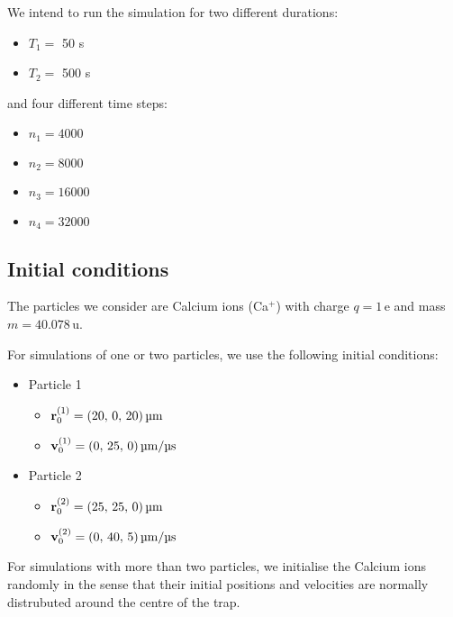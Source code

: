 We intend to run the simulation for two different durations:
\begin{itemize}
    \item[] $T_1 = $ 50 \textmu s
    \item[] $T_2 = $ 500 \textmu s
\end{itemize}
and four different time steps:
\begin{itemize}
    \item[] $n_1 = 4000$
    \item[] $n_2 = 8000$
    \item[] $n_3 = 16000$
    \item[] $n_4 = 32000$
\end{itemize}


\subsection{Initial conditions}\label{sec:initial_conditions}

The particles we consider are Calcium ions (Ca$^+$) with charge $q=1 \,\mathrm{e}$ and mass $m = 40.078 \,\mathrm{u}$. 

For simulations of one or two particles, we use the following initial conditions:
\begin{itemize}
    \item Particle 1\label{item:initial_conditions_p1}
    \begin{itemize}
        \item[] $\vec{r}^{(1)}_0 = (20, \,0, \,20) \, \mathrm{\text{\textmu}m} $
        \item[] $\vec{v}^{(1)}_0 = (0,\,25,\,0) \, \mathrm{\text{\textmu}m}/ \mathrm{\text{\textmu}s}$
    \end{itemize}
    \item Particle 2\label{item:initial_conditions_p2}
    \begin{itemize}
        \item[] $\vec{r}^{(2)}_0 = (25, \,25, \,0) \, \mathrm{\text{\textmu}m} $
        \item[] $\vec{v}^{(2)}_0 = (0,\,40,\,5) \, \mathrm{\text{\textmu}m}/ \mathrm{\text{\textmu}s}$
    \end{itemize}
\end{itemize}

For simulations with more than two particles, we initialise the Calcium ions randomly in the sense that their initial positions and velocities are normally distrubuted around the centre of the trap.





































